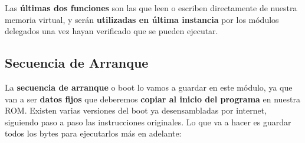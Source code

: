 Las \textbf{últimas dos funciones} son las que leen o escriben directamente de nuestra memoria virtual, y serán \textbf{utilizadas en última instancia} por los módulos delegados una vez hayan verificado que se pueden ejecutar.

\subsection{Secuencia de Arranque}

La \textbf{secuencia de arranque} o boot lo vamos a guardar en este módulo, ya que van a ser \textbf{datos fijos} que deberemos \textbf{copiar al inicio del programa} en nuestra ROM. Existen varias versiones del boot ya desensambladas por internet, siguiendo paso a paso las instrucciones originales. Lo que va a hacer es guardar todos los bytes para ejecutarlos más en adelante:


